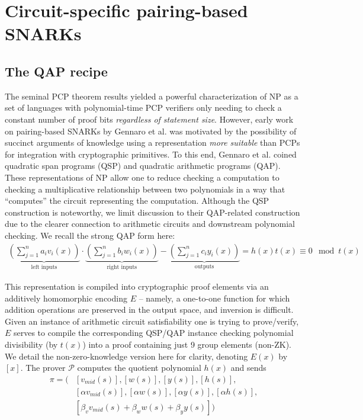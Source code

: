 \section{Circuit-specific pairing-based SNARKs}
\subsection{The QAP recipe}\label{subsec:recipe}
\noindent The seminal PCP theorem results \cite{pcpthm1, pcpthm2} yielded a powerful characterization of NP as a set of languages with polynomial-time PCP verifiers only needing to check a constant number of proof bits \textit{regardless of statement size}. However, early work on pairing-based SNARKs by Gennaro et al. \cite{snarknopcp} was motivated by the possibility of succinct arguments of knowledge using a representation \textit{more suitable} than PCPs for integration with cryptographic primitives. To this end, Gennaro et al. \cite{snarknopcp} coined quadratic span programs (QSP) and quadratic arithmetic programs (QAP). These representations of NP allow one to reduce checking a computation to checking a multiplicative relationship between two polynomials in a way that ``computes'' the circuit representing the computation. Although the QSP construction is noteworthy, we limit discussion to their QAP-related construction due to the clearer connection to arithmetic circuits and downstream polynomial checking. We recall the strong QAP form here:
\begin{align}
\underbrace{\left(\sum_{j=1}^n a_i v_i(x)\right)}_{\text{left inputs}} \cdot \underbrace{\left(\sum_{j=1}^n b_i w_i(x)\right)}_{\text{right inputs}} - \underbrace{\left(\sum_{j=1}^n c_i y_i(x)\right)}_{\text{outputs}} = h(x) t(x) \equiv 0 \mod t(x)
\end{align}

\noindent This representation is compiled into cryptographic proof elements via an additively homomorphic encoding $E$ -- namely, a one-to-one function for which addition operations are preserved in the output space, and inversion is difficult. Given an instance of arithmetic circuit satisfiability one is trying to prove/verify, $E$ serves to compile the corresponding QSP/QAP instance checking polynomial divisibility (by $t(x)$) into a proof containing just 9 group elements (non-ZK). We detail the non-zero-knowledge version here for clarity, denoting $E(x)$ by $[x]$. The prover $\mathcal{P}$ computes the quotient polynomial $h(x)$ and sends
\begin{align*}
    \pi = \Big(&[v_{mid}(s)], [w(s)], [y(s)], [h(s)], \\ 
    &[\alpha v_{mid}(s)], [\alpha w(s)], [\alpha y(s)], [\alpha h(s)], \\ 
    &[\beta_v v_{mid}(s) + \beta_w w(s) + \beta_y y(s)]\Big)
\end{align*}

